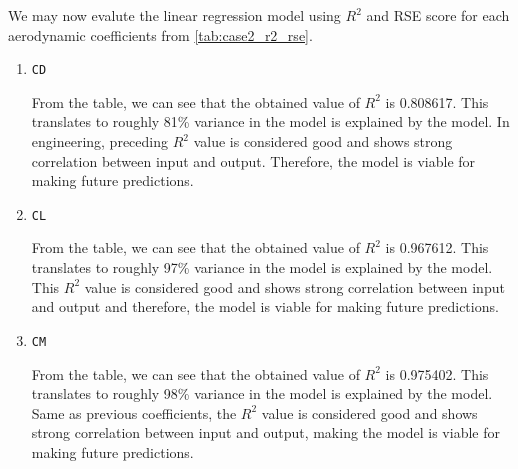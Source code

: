 \documentclass[conf]{new-aiaa}
\begin{document}
We may now evalute the linear regression model using $R^2$ and RSE score for each aerodynamic coefficients from \ref{tab:case2_r2_rse}.
\begin{enumerate}
    \item \texttt{CD}
    
    From the table, we can see that the obtained value of $R^2$ is 0.808617. This translates to roughly 81\% variance in the model is explained by the model. In engineering, preceding $R^2$ value is considered good and shows strong correlation between input and output. Therefore, the model is viable for making future predictions.
    \item \texttt{CL}
    
    From the table, we can see that the obtained value of $R^2$ is 0.967612. This translates to roughly 97\% variance in the model is explained by the model. This $R^2$ value is considered good and shows strong correlation between input and output and therefore, the model is viable for making future predictions.
    \item \texttt{CM}
    
    From the table, we can see that the obtained value of $R^2$ is 0.975402. This translates to roughly 98\% variance in the model is explained by the model. Same as previous coefficients, the $R^2$ value is considered good and shows strong correlation between input and output, making the model is viable for making future predictions.
\end{enumerate}
\end{document}
